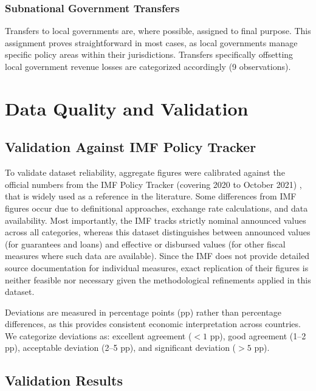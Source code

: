 \documentclass[12pt]{article}
\begin{document}
\subsubsection{Subnational Government Transfers}

Transfers to local governments are, where possible, assigned to final purpose. This assignment proves straightforward in most cases, as local governments manage specific policy areas within their jurisdictions. Transfers specifically offsetting local government revenue losses are categorized accordingly (9 observations).

\section{Data Quality and Validation}

\subsection{Validation Against IMF Policy Tracker}

To validate dataset reliability, aggregate figures were calibrated against the official numbers from the IMF Policy Tracker (covering 2020 to October 2021) \citep{IMFPolicyResponsesCovid19}, that is widely used as a reference in the literature. Some differences from IMF figures occur due to definitional approaches, exchange rate calculations, and data availability. Most importantly, the IMF tracks strictly nominal announced values across all categories, whereas this dataset distinguishes between announced values (for guarantees and loans) and effective or disbursed values (for other fiscal measures where such data are available). Since the IMF does not provide detailed source documentation for individual measures, exact replication of their figures is neither feasible nor necessary given the methodological refinements applied in this dataset.
\vspace{3mm}

Deviations are measured in percentage points (pp) rather than percentage differences, as this provides consistent economic interpretation across countries. We categorize deviations as: excellent agreement ($<1$ pp), good agreement (1--2 pp), acceptable deviation (2--5 pp), and significant deviation ($>5$ pp).

\subsection{Validation Results}
\end{document}
